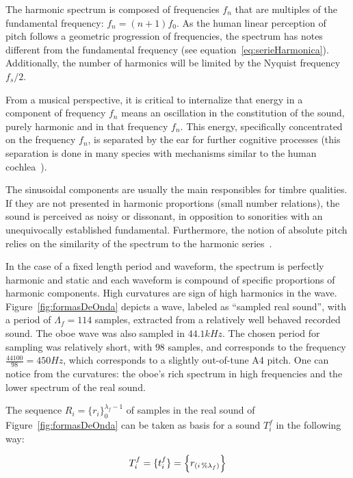 \documentclass[
 aip,
 jmp,
 amsmath,amssymb,
 reprint,
]{revtex4-1}
\begin{document}
The harmonic spectrum is composed of frequencies $f_n$ that are multiples of the fundamental frequency: $f_n=(n+1)f_0$. As the human linear perception of pitch follows  a geometric progression of frequencies, the spectrum has notes different from the fundamental frequency (see equation~\ref{eq:serieHarmonica}). Additionally, the number of harmonics will be limited by the Nyquist frequency $f_s/2$.

From a musical perspective, it is critical to internalize that energy in a component of frequency $f_n$ means an oscillation in the constitution of the sound, purely harmonic and in that frequency $f_n$. This energy, specifically concentrated on the frequency $f_n$, is separated by the ear for further cognitive processes (this separation is done in many species with mechanisms similar to the human cochlea~\cite{Roederer}).

The sinusoidal components are usually the main responsibles for timbre qualities. If they are not presented in harmonic proportions (small number relations), the sound is perceived as noisy or dissonant, in opposition to sonorities with an unequivocally established fundamental. Furthermore, the notion of absolute pitch relies on the similarity of the spectrum to the harmonic series~\cite{Roederer}. 

In the case of a fixed length period and waveform, the spectrum is perfectly harmonic and static and  each waveform is compound of specific proportions of harmonic components. High  curvatures are sign of high harmonics in the wave. Figure~\ref{fig:formasDeOnda} depicts a wave, labeled as ``sampled real sound'', with a period of $\Lambda_f=114$ samples, extracted from a relatively well behaved recorded sound. The oboe wave was also sampled in $44.1kHz$. The chosen period for sampling was relatively short, with $98$ samples, and corresponds to the frequency $\frac{44100}{98}=450Hz$, which corresponds to a slightly out-of-tune A4 pitch. One can notice from the curvatures: the oboe's rich spectrum in high frequencies and the lower spectrum of the real sound.

The sequence 
$ R_i=\{ r_i \}_0^{\lambda_f-1}$ of samples in the real sound of Figure~\ref{fig:formasDeOnda} can be taken as basis for a sound $T_i^f$ in the following way: 

\begin{equation}\label{sampleandoFormaDeOnda}
     T^f_i=\{ t_i^f \}=\Bigl\{ r_{(i\,\%\lambda_{f})} \Bigr\}
\end{equation}
\end{document}
